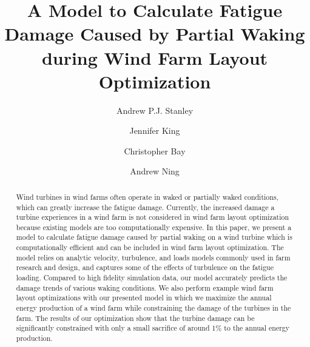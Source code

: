 \documentclass[11pt,letterpaper]{article}
\begin{document}
\title{A Model to Calculate Fatigue Damage Caused by Partial Waking during Wind Farm Layout Optimization}

\date{}

\author[1]{Andrew P.J. Stanley}
\author[2]{Jennifer King}
\author[2]{Christopher Bay}
\author[1]{Andrew Ning}




\maketitle



\begin{abstract}
Wind turbines in wind farms often operate in waked or partially waked conditions, which can greatly increase the fatigue damage. Currently, the increased damage a turbine experiences in a wind farm is not considered in wind farm layout optimization because existing models are too computationally expensive. In this paper, we present a model to calculate fatigue damage caused by partial waking on a wind turbine which is computationally efficient and can be included in wind farm layout optimization. The model relies on analytic velocity, turbulence, and loads models commonly used in farm research and design, and captures some of the effects of turbulence on the fatigue loading. Compared to high fidelity simulation data, our model accurately predicts the damage trends of various waking conditions. We also perform example wind farm layout optimizations with our presented model in which we maximize the annual energy production of a wind farm while constraining the damage of the turbines in the farm. The results of our optimization show that the turbine damage can be significantly constrained with only a small sacrifice of around 1\% to the annual energy production.
\end{abstract}
\end{document}
